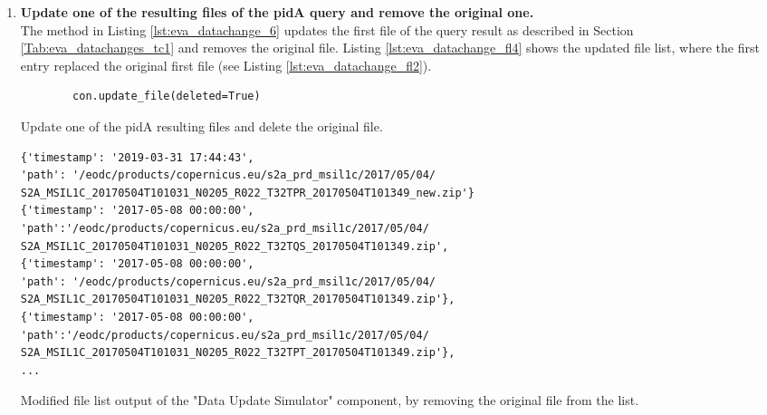 \documentclass[draft,final]{vutinfth} %
\newenvironment{code}{\captionsetup{type=listing}}{}
\begin{document}
\begin{enumerate}
	\setcounter{enumi}{+1}
	\item \textbf{Update one of the resulting files of the pidA query and remove the original one.}\\ 
	The method in Listing \ref{lst:eva_datachange_6} updates the first file of the query result as described in Section \ref{Tab:eva_datachanges_tc1} and removes the original file. Listing \ref{lst:eva_datachange_fl4} shows the updated file list, where the first entry replaced the original first file (see Listing \ref{lst:eva_datachange_fl2}).
	\begin{code}
		\begin{verbatim}
		con.update_file(deleted=True)
		\end{verbatim}
		\caption{Update one of the pidA resulting files and delete the original file.}
		\label{lst:eva_datachange_6}
	\end{code}

	\begin{code}
		\begin{verbatim} 
{'timestamp': '2019-03-31 17:44:43', 
'path': '/eodc/products/copernicus.eu/s2a_prd_msil1c/2017/05/04/
S2A_MSIL1C_20170504T101031_N0205_R022_T32TPR_20170504T101349_new.zip'}
{'timestamp': '2017-05-08 00:00:00',
'path':'/eodc/products/copernicus.eu/s2a_prd_msil1c/2017/05/04/
S2A_MSIL1C_20170504T101031_N0205_R022_T32TQS_20170504T101349.zip', 
{'timestamp': '2017-05-08 00:00:00', 
'path': '/eodc/products/copernicus.eu/s2a_prd_msil1c/2017/05/04/
S2A_MSIL1C_20170504T101031_N0205_R022_T32TQR_20170504T101349.zip'}, 
{'timestamp': '2017-05-08 00:00:00',
'path':'/eodc/products/copernicus.eu/s2a_prd_msil1c/2017/05/04/
S2A_MSIL1C_20170504T101031_N0205_R022_T32TPT_20170504T101349.zip'},
...
		\end{verbatim}
		\caption{Modified file list output of the "Data Update Simulator" component, by removing the original file from the list.}
		\label{lst:eva_datachange_fl4}
	\end{code}	


\end{enumerate}
\end{document}
